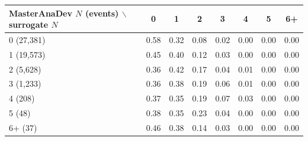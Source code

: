 \begin{tabular}{lccccccc}
\toprule
MasterAnaDev $N$ (events) $\backslash$ surrogate $N$ & 0 & 1 & 2 & 3 & 4 & 5 & 6+ \\
\midrule
0 (27,381) & 0.58 & 0.32 & 0.08 & 0.02 & 0.00 & 0.00 & 0.00 \\
1 (19,573) & 0.45 & 0.40 & 0.12 & 0.03 & 0.00 & 0.00 & 0.00 \\
2 (5,628) & 0.36 & 0.42 & 0.17 & 0.04 & 0.01 & 0.00 & 0.00 \\
3 (1,233) & 0.36 & 0.38 & 0.19 & 0.06 & 0.01 & 0.00 & 0.00 \\
4 (208) & 0.37 & 0.35 & 0.19 & 0.07 & 0.03 & 0.00 & 0.00 \\
5 (48) & 0.38 & 0.35 & 0.23 & 0.04 & 0.00 & 0.00 & 0.00 \\
6+ (37) & 0.46 & 0.38 & 0.14 & 0.03 & 0.00 & 0.00 & 0.00 \\
\bottomrule
\end{tabular}
